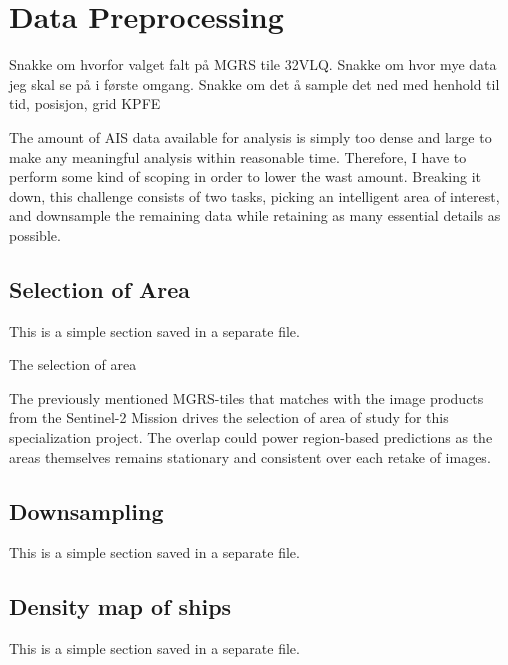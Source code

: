 \chapter[Data Preprocessing]{Data Preprocessing}
\begin{info}
	Snakke om hvorfor valget falt på MGRS tile 32VLQ. Snakke om hvor mye data jeg skal se på i første omgang. Snakke om det å sample det ned med henhold til tid, posisjon, grid KPFE
\end{info}

The amount of AIS data available for analysis is simply too dense and large to make any meaningful analysis within reasonable time. Therefore, I have to perform some kind of scoping in order to lower the wast amount. Breaking it down, this challenge consists of two tasks, picking an intelligent area of interest, and downsample the remaining data while retaining as many essential details as possible. 


\section{Selection of Area}
\begin{info}{}
	This is a simple section saved in a separate file.
\end{info}
The selection of area 


The previously mentioned MGRS-tiles that matches with the image products from the Sentinel-2 Mission drives the selection of area of study for this specialization project. The overlap could power region-based predictions as the areas themselves remains stationary and consistent over each retake of images.  






\section{Downsampling}
\begin{info}{}
	This is a simple section saved in a separate file.
\end{info}







\section{Density map of ships}
\begin{info}{}
	This is a simple section saved in a separate file.
\end{info}





